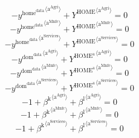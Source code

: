 \begin{equation}
-{y^{\mathrm{home}^{\mathrm{data}}}}^{\langle \mathrm{\mathrm{a}^{\mathrm{Agri}}}\rangle} + {Y^{\mathrm{HOME}}}^{\langle \mathrm{a}^{\mathrm{Agri}}\rangle} = 0
\end{equation}
\begin{equation}
-{y^{\mathrm{home}^{\mathrm{data}}}}^{\langle \mathrm{\mathrm{a}^{\mathrm{Mnfc}}}\rangle} + {Y^{\mathrm{HOME}}}^{\langle \mathrm{a}^{\mathrm{Mnfc}}\rangle} = 0
\end{equation}
\begin{equation}
-{y^{\mathrm{home}^{\mathrm{data}}}}^{\langle \mathrm{\mathrm{a}^{\mathrm{Services}}}\rangle} + {Y^{\mathrm{HOME}}}^{\langle \mathrm{a}^{\mathrm{Services}}\rangle} = 0
\end{equation}
\begin{equation}
-{y^{\mathrm{dom}^{\mathrm{data}}}}^{\langle \mathrm{\mathrm{a}^{\mathrm{Agri}}}\rangle} + {Y^{\mathrm{HOME}^{\mathrm{a}}}}^{\langle \mathrm{a}^{\mathrm{Agri}}\rangle} = 0
\end{equation}
\begin{equation}
-{y^{\mathrm{dom}^{\mathrm{data}}}}^{\langle \mathrm{\mathrm{a}^{\mathrm{Mnfc}}}\rangle} + {Y^{\mathrm{HOME}^{\mathrm{a}}}}^{\langle \mathrm{a}^{\mathrm{Mnfc}}\rangle} = 0
\end{equation}
\begin{equation}
-{y^{\mathrm{dom}^{\mathrm{data}}}}^{\langle \mathrm{\mathrm{a}^{\mathrm{Services}}}\rangle} + {Y^{\mathrm{HOME}^{\mathrm{a}}}}^{\langle \mathrm{a}^{\mathrm{Services}}\rangle} = 0
\end{equation}
\begin{equation}
-1 + {\beta^{\mathrm{k}}}^{\langle \mathrm{\mathrm{a}^{\mathrm{Agri}}}\rangle} + {\beta^{\mathrm{l}}}^{\langle \mathrm{\mathrm{a}^{\mathrm{Agri}}}\rangle} = 0
\end{equation}
\begin{equation}
-1 + {\beta^{\mathrm{k}}}^{\langle \mathrm{\mathrm{a}^{\mathrm{Mnfc}}}\rangle} + {\beta^{\mathrm{l}}}^{\langle \mathrm{\mathrm{a}^{\mathrm{Mnfc}}}\rangle} = 0
\end{equation}
\begin{equation}
-1 + {\beta^{\mathrm{k}}}^{\langle \mathrm{\mathrm{a}^{\mathrm{Services}}}\rangle} + {\beta^{\mathrm{l}}}^{\langle \mathrm{\mathrm{a}^{\mathrm{Services}}}\rangle} = 0
\end{equation}





